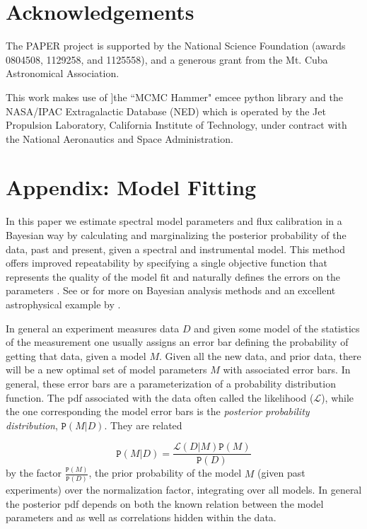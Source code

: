 \documentclass[preprint]{aastex}
\newcommand{\Prob}{\mathtt{P}}
\begin{document}
\section*{Acknowledgements}

The PAPER project is supported by the National Science Foundation (awards
0804508, 1129258, and 1125558), and a generous grant from the Mt. Cuba
Astronomical Association.

This work makes use of ]the ``MCMC Hammer" emcee python library \citep[
\url{http://danfm.ca/emcee/}]{ForemanMackey:2012p8684}  and the NASA/IPAC
Extragalactic Database (NED) which is operated by the Jet Propulsion
Laboratory, California Institute of Technology, under contract with the
National Aeronautics and Space Administration.

\section*{Appendix: Model Fitting}

In this paper we estimate spectral model parameters and flux calibration in a
Bayesian way by calculating and marginalizing the posterior probability of the
data, past and present, given a spectral and instrumental model.   This method
offers improved repeatability by specifying a single objective function that
represents the quality of the model fit and naturally defines the errors on the
parameters \citep{Hogg:2010p8759}.   See  \citet{Mackay:2003p9717}  or
\citet{Sivia:2006p9736} for more on Bayesian analysis methods and an excellent
astrophysical example by \cite{Press:1997p9783}.

In general an experiment measures data $D$ and given some model of the
statistics of the measurement one usually assigns an error bar defining the
probability of getting that data, given a model $M$.  Given all the new data,
and prior data, there will be a new optimal set of model parameters $M$ with
associated error bars.  In general, these error bars are a parameterization of
a probability distribution function.  The pdf associated with the data often
called the likelihood ($\mathcal{L}$), while the one corresponding the model
error bars is the {\em posterior probability distribution}, $\Prob(M|D)$. They
are related

\[
\Prob(M|D) = \frac{\mathcal{L}(D|M) \Prob(M)}{\Prob(D)}
\] 
by the factor $\frac{\Prob(M)}{\Prob(D)}$, the prior probability of the model
$M$ (given past experiments) over the normalization factor, integrating over
all models.  In general the posterior pdf depends on both the known relation
between the model parameters and as well as correlations hidden within the
data.  
\end{document}
